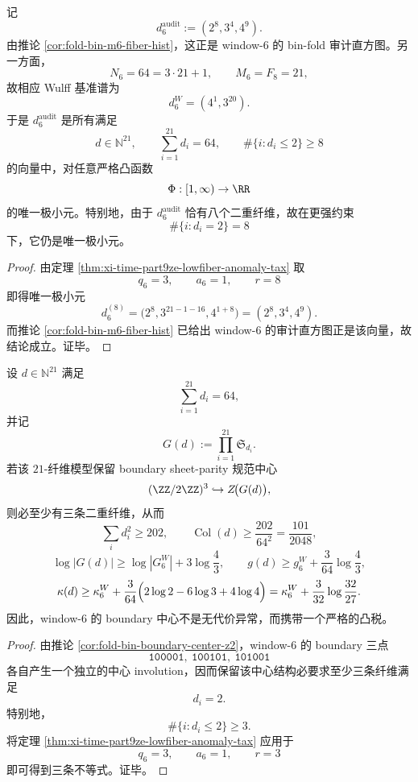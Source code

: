 \begin{theorem}\label{thm:xi-time-part9ze-window6-audit-variational-characterization}
记
\[
d_6^{\mathrm{audit}}:=(2^8,3^4,4^9).
\]
由推论 \ref{cor:fold-bin-m6-fiber-hist}，这正是 window-\(6\) 的 bin-fold 审计直方图。另一方面，
\[
N_6=64=3\cdot 21+1,
\qquad
M_6=F_8=21,
\]
故相应 Wulff 基准谱为
\[
d_6^W=(4^1,3^{20}).
\]
于是 \(d_6^{\mathrm{audit}}\) 是所有满足
\[
d\in \mathbb N^{21},
\qquad
\sum_{i=1}^{21}d_i=64,
\qquad
\#\{i:d_i\le 2\}\ge 8
\]
的向量中，对任意严格凸函数
\[
\Phi:[1,\infty)\to \RR
\]
的唯一极小元。特别地，由于 \(d_6^{\mathrm{audit}}\) 恰有八个二重纤维，故在更强约束
\[
\#\{i:d_i=2\}=8
\]
下，它仍是唯一极小元。
\end{theorem}
\begin{proof}
由定理 \ref{thm:xi-time-part9ze-lowfiber-anomaly-tax} 取
\[
q_6=3,\qquad a_6=1,\qquad r=8
\]
即得唯一极小元
\[
d_6^{(8)}=
\bigl(2^8,3^{21-1-16},4^{1+8}\bigr)
=(2^8,3^4,4^9).
\]
而推论 \ref{cor:fold-bin-m6-fiber-hist} 已给出 window-\(6\) 的审计直方图正是该向量，故结论成立。证毕。
\end{proof}

\begin{corollary}\label{cor:xi-time-part9ze-window6-boundary-center-convex-tax}
设 \(d\in \mathbb N^{21}\) 满足
\[
\sum_{i=1}^{21}d_i=64,
\]
并记
\[
G(d):=\prod_{i=1}^{21}\mathfrak S_{d_i}.
\]
若该 \(21\)-纤维模型保留 boundary sheet-parity 规范中心
\[
(\ZZ/2\ZZ)^3\hookrightarrow Z\!\bigl(G(d)\bigr),
\]
则必至少有三条二重纤维，从而
\[
\sum_i d_i^2\ge 202,
\qquad
\operatorname{Col}(d)\ge \frac{202}{64^2}=\frac{101}{2048},
\]
\[
\log|G(d)|\ge \log|G_6^W|+3\log\frac43,
\qquad
g(d)\ge g_6^W+\frac{3}{64}\log\frac43,
\]
\[
\kappa(d)\ge
\kappa_6^W+\frac{3}{64}\Bigl(2\log 2-6\log 3+4\log 4\Bigr)
=
\kappa_6^W+\frac{3}{32}\log\frac{32}{27}.
\]
因此，window-\(6\) 的 boundary 中心不是无代价异常，而携带一个严格的凸税。
\end{corollary}
\begin{proof}
由推论 \ref{cor:fold-bin-boundary-center-z2}，window-\(6\) 的 boundary 三点
\[
\texttt{100001},\ \texttt{100101},\ \texttt{101001}
\]
各自产生一个独立的中心 involution，因而保留该中心结构必要求至少三条纤维满足
\[
d_i=2.
\]
特别地，
\[
\#\{i:d_i\le 2\}\ge 3.
\]
将定理 \ref{thm:xi-time-part9ze-lowfiber-anomaly-tax} 应用于
\[
q_6=3,\qquad a_6=1,\qquad r=3
\]
即可得到三条不等式。证毕。
\end{proof}

